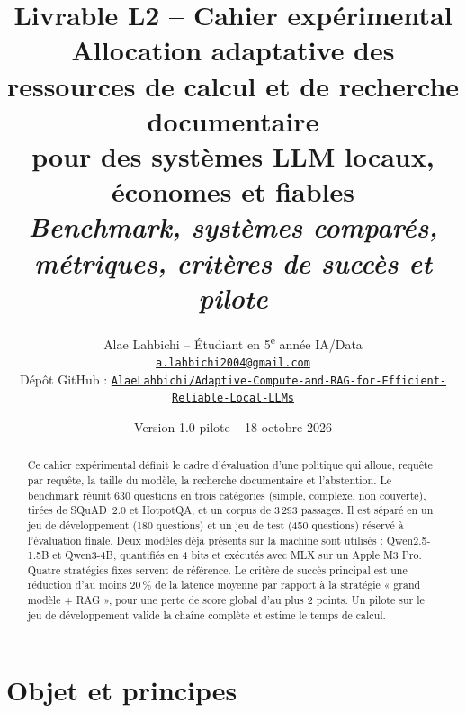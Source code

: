 \documentclass[11pt,a4paper]{article}
\title{\textbf{Livrable L2 -- Cahier expérimental}\\[4pt]
\large Allocation adaptative des ressources de calcul et de recherche documentaire\\ pour des systèmes LLM locaux, économes et fiables\\[2pt]
\normalsize\textit{Benchmark, systèmes comparés, métriques, critères de succès et pilote}}
\author{Alae Lahbichi -- Étudiant en 5\textsuperscript{e} année IA/Data\\[2pt]
\small\href{mailto:a.lahbichi2004@gmail.com}{\texttt{a.lahbichi2004@gmail.com}}\\
\small Dépôt GitHub : \href{https://github.com/AlaeLahbichi/Adaptive-Compute-and-RAG-for-Efficient-Reliable-Local-LLMs}{\footnotesize\texttt{AlaeLahbichi/Adaptive-Compute-and-RAG-for-Efficient-Reliable-Local-LLMs}}}
\date{Version 1.0-pilote -- 18 octobre 2026}
\begin{document}
\maketitle

\begin{center}
\end{center}

\begin{abstract}
\noindent Ce cahier expérimental définit le cadre d'évaluation d'une politique qui alloue, requête par
requête, la taille du modèle, la recherche documentaire et l'abstention. Le benchmark réunit
630 questions en trois catégories (simple, complexe, non couverte), tirées de SQuAD~2.0 et HotpotQA,
et un corpus de 3\,293 passages. Il est séparé en un jeu de développement (180 questions) et un jeu de
test (450 questions) réservé à l'évaluation finale. Deux modèles déjà présents sur la machine sont
utilisés : Qwen2.5-1.5B et Qwen3-4B, quantifiés en 4 bits et exécutés avec MLX sur un Apple M3 Pro.
Quatre stratégies fixes servent de référence. Le critère de succès principal est une réduction d'au
moins 20\,\% de la latence moyenne par rapport à la stratégie « grand modèle + RAG », pour une perte
de score global d'au plus 2 points. Un pilote sur le jeu de développement valide la chaîne complète
et estime le temps de calcul.
\end{abstract}

\clearpage
\tableofcontents
\clearpage

\section{Objet et principes}\label{sec:objet}
\end{document}
